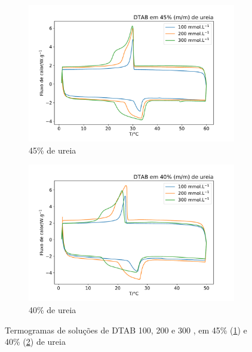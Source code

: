 	\begin{figure}[H]
		\centering
		\begin{subfigure}[t]{0.45\textwidth}
			\includegraphics[width=\textwidth]{./imagens/dsc/DTAB_45p}
			\caption{45\% de ureia}
			\label{fig:DSC_DTAB_UR45}
		\end{subfigure} \qquad %
		\begin{subfigure}[t]{0.45\textwidth}
			\includegraphics[width=\textwidth]{./imagens/dsc/DTAB_40p}
			\caption{40\% de ureia}
			\label{fig:DSC_DTAB_UR40}
		\end{subfigure}
		\caption{Termogramas de soluções de DTAB 100, 200 e 300 \mM{}, em 45\% (\ref{fig:DSC_DTAB_UR45}) e 40\% (\ref{fig:DSC_DTAB_UR40}) de ureia}
		\label{fig:DSC_DTAB_UR_40-45}
	\end{figure}
	

